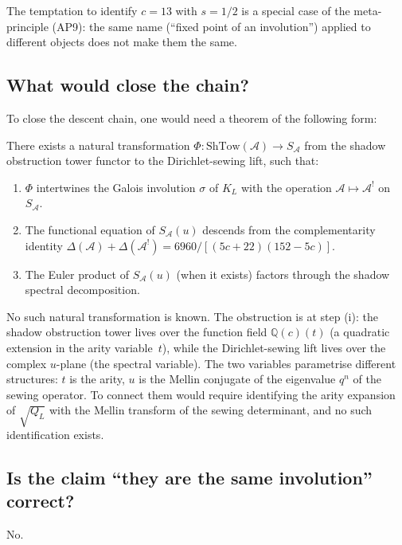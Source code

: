 \documentclass[11pt]{article}
\newcommand{\cA}{\mathcal{A}}
\newcommand{\Q}{\mathbb{Q}}
\begin{document}
The temptation to identify $c = 13$ with $s = 1/2$ is a
special case of the meta-principle (AP9): the same name (``fixed
point of an involution'') applied to different objects does not
make them the same.

\subsection{What would close the chain?}

To close the descent chain, one would need a theorem of the
following form:

\begin{conjecture}
\label{conj:closed-descent}
There exists a natural transformation
$\Phi\colon \mathrm{ShTow}(\cA) \to S_\cA$ from the shadow obstruction tower
functor to the Dirichlet-sewing lift, such that:
\begin{enumerate}[label=\textup{(\roman*)}]
\item $\Phi$ intertwines the Galois involution $\sigma$ of
  $K_L$ with the operation $\cA \mapsto \cA^!$ on $S_\cA$.
\item The functional equation of $S_\cA(u)$ descends from the
  complementarity identity
  $\Delta(\cA) + \Delta(\cA^!) = 6960/[(5c{+}22)(152{-}5c)]$.
\item The Euler product of $S_\cA(u)$ (when it exists) factors
  through the shadow spectral decomposition.
\end{enumerate}
\end{conjecture}

No such natural transformation is known.  The obstruction is
at step (i): the shadow obstruction tower lives over the function field
$\Q(c)(t)$ (a quadratic extension in the arity variable~$t$),
while the Dirichlet-sewing lift lives over the complex $u$-plane
(the spectral variable).  The two variables parametrise different
structures: $t$ is the arity, $u$ is the Mellin conjugate of
the eigenvalue $q^n$ of the sewing operator.  To connect them
would require identifying the arity expansion of $\sqrt{Q_L}$
with the Mellin transform of the sewing determinant, and no such
identification exists.

\subsection{Is the claim ``they are the same involution'' correct?}

No.
\end{document}
